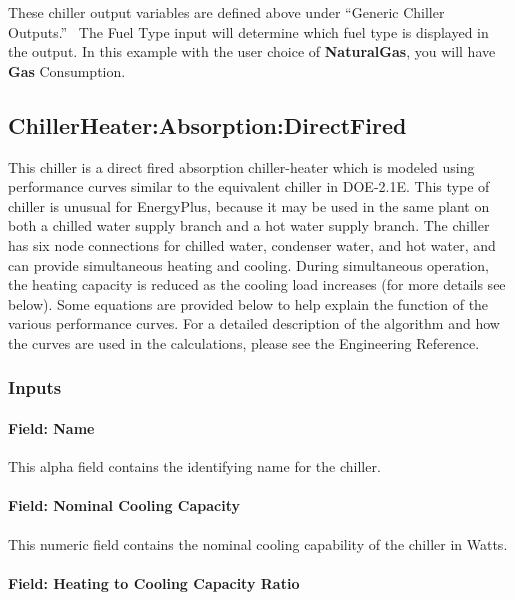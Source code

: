 These chiller output variables are defined above under ``Generic Chiller Outputs.''~ The Fuel Type input will determine which fuel type is displayed in the output. In this example with the user choice of \textbf{NaturalGas}, you will have \textbf{Gas} Consumption.

\subsection{ChillerHeater:Absorption:DirectFired}\label{chillerheaterabsorptiondirectfired}

This chiller is a direct fired absorption chiller-heater which is modeled using performance curves similar to the equivalent chiller in DOE-2.1E. This type of chiller is unusual for EnergyPlus, because it may be used in the same plant on both a chilled water supply branch and a hot water supply branch. The chiller has six node connections for chilled water, condenser water, and hot water, and can provide simultaneous heating and cooling. During simultaneous operation, the heating capacity is reduced as the cooling load increases (for more details see below). Some equations are provided below to help explain the function of the various performance curves. For a detailed description of the algorithm and how the curves are used in the calculations, please see the Engineering Reference.

\subsubsection{Inputs}\label{inputs-8-016}

\paragraph{Field: Name}\label{field-name-7-014}

This alpha field contains the identifying name for the chiller.

\paragraph{Field: Nominal Cooling Capacity}\label{field-nominal-cooling-capacity}

This numeric field contains the nominal cooling capability of the chiller in Watts.

\paragraph{Field: Heating to Cooling Capacity Ratio}\label{field-heating-to-cooling-capacity-ratio}

